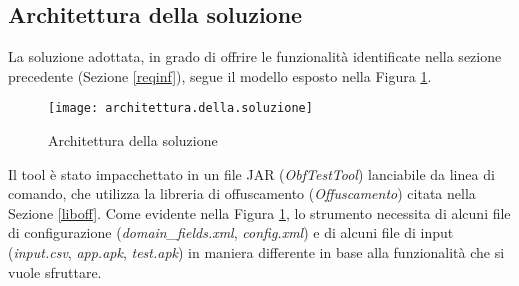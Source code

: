 

\subsection{Architettura della soluzione}
La soluzione adottata, in grado di offrire le funzionalità identificate nella sezione precedente (Sezione \ref{reqinf}), segue il modello esposto nella Figura  \ref{fig:archsol}.
\begin{figure}[H]
	\texttt{[image: architettura.della.soluzione]}
	\centering
	\caption{Architettura della soluzione}%
    \label{fig:archsol}
\end{figure}
\noindent Il tool è stato impacchettato in un file JAR (\emph{ObfTestTool}) lanciabile da linea di comando, che utilizza la libreria di offuscamento (\emph{Offuscamento}) citata nella Sezione \ref{liboff}.  Come evidente nella Figura \ref{fig:archsol}, lo strumento necessita di alcuni file di configurazione  (\emph{domain\_fields.xml}, \emph{config.xml}) e di alcuni file di input  (\emph{input.csv}, \emph{app.apk}, \emph{test.apk}) in maniera differente in base alla funzionalità che si vuole sfruttare.